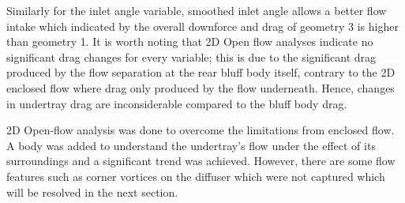 \noindent Similarly for the inlet angle variable, smoothed inlet angle allows a better flow intake which indicated by the overall downforce and drag of geometry 3 is higher than geometry 1. It is worth noting that 2D Open flow analyses indicate no significant drag changes for every variable; this is due to the significant drag produced by the flow separation at the rear bluff body itself, contrary to the 2D enclosed flow where drag only produced by the flow underneath. Hence, changes in undertray drag are inconsiderable compared to the bluff body drag.

\noindent 2D Open-flow analysis was done to overcome the limitations from enclosed flow. A body was added to understand the undertray's flow under the effect of its surroundings and a significant trend was achieved. However, there are some flow features such as corner vortices on the diffuser which were not captured which  will be resolved in the next section.



